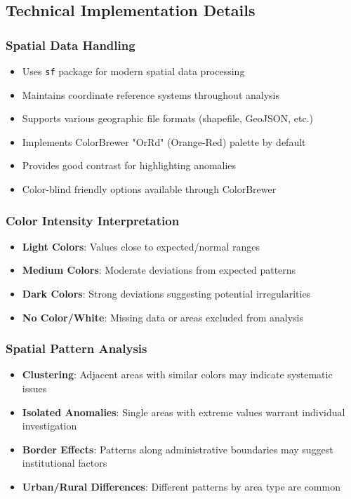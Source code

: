 \documentclass{article}
\begin{document}
\subsection{Technical Implementation Details}

\subsubsection{Spatial Data Handling}
\begin{itemize}
    \item Uses \texttt{sf} package for modern spatial data processing
    \item Maintains coordinate reference systems throughout analysis
    \item Supports various geographic file formats (shapefile, GeoJSON, etc.)
    \item Implements ColorBrewer "OrRd" (Orange-Red) palette by default
    \item Provides good contrast for highlighting anomalies
    \item Color-blind friendly options available through ColorBrewer
\end{itemize}

\subsubsection{Color Intensity Interpretation}
\begin{itemize}
    \item \textbf{Light Colors}: Values close to expected/normal ranges
    \item \textbf{Medium Colors}: Moderate deviations from expected patterns  
    \item \textbf{Dark Colors}: Strong deviations suggesting potential irregularities
    \item \textbf{No Color/White}: Missing data or areas excluded from analysis
\end{itemize}

\subsubsection{Spatial Pattern Analysis}
\begin{itemize}
    \item \textbf{Clustering}: Adjacent areas with similar colors may indicate systematic issues
    \item \textbf{Isolated Anomalies}: Single areas with extreme values warrant individual investigation
    \item \textbf{Border Effects}: Patterns along administrative boundaries may suggest institutional factors
    \item \textbf{Urban/Rural Differences}: Different patterns by area type are common
\end{itemize}
\end{document}
